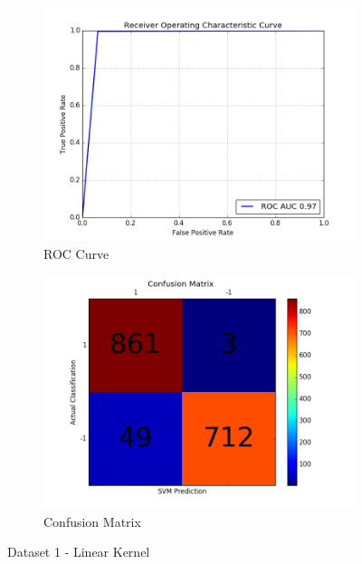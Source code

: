 \begin{figure}[h]
	
	\begin{subfigure}{0.5\textwidth}
		\includegraphics[width=0.9\linewidth]{images/AUC-Dataset1-linear} 
		\caption{ROC Curve}
		\label{fig:AUC_Dataset1_linear}
	\end{subfigure}
	\begin{subfigure}{0.5\textwidth}
		\includegraphics[width=0.9\linewidth]{images/CM-Dataset1-linear}
		\caption{Confusion Matrix}
		\label{fig:CM_Dataset1_linear}
	\end{subfigure}
	
	\caption{Dataset 1 - Linear Kernel}
	\label{fig:Dataset1_linear_results}
\end{figure}



